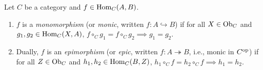 \documentclass[10pt,a4paper]{article}
\begin{document}
\begin{definition}\label{def:mono_epi}
Let $C$ be a category and $f \in {\textrm{Hom}}_C(A, B)$.
\begin{enumerate}
\item $f$ is a \emph{monomorphism} (or \emph{monic}, written $f : A \hookrightarrow B$) if for all $X \in {\textrm{Ob}}_C$ and $g_1, g_2 \in {\textrm{Hom}}_C(X, A)$, $f \circ_C g_1 = f \circ_C g_2 \implies g_1 = g_2$.
\item Dually, $f$ is an \emph{epimorphism} (or \emph{epic}, written $f : A \twoheadrightarrow B$, i.e., monic in $C^{\textrm{op}}$) if for all $Z \in {\textrm{Ob}}_C$ and $h_1, h_2 \in {\textrm{Hom}}_C(B, Z)$, $h_1 \circ_C f = h_2 \circ_C f \implies h_1 = h_2$.
\end{enumerate}
\end{definition}
\end{document}
